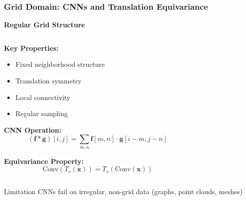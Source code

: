 \begin{frame}[fragile]\frametitle{Grid Domain: CNNs and Translation Equivariance}

\begin{center}
\textbf{Regular Grid Structure}
\end{center}

\begin{columns}
\begin{column}{0.6\textwidth}
\textbf{Key Properties:}
\begin{itemize}
\item Fixed neighborhood structure
\item Translation symmetry
\item Local connectivity
\item Regular sampling
\end{itemize}

\vspace{0.5cm}
\textbf{CNN Operation:}
$$(\mathbf{f} * \mathbf{g})[i,j] = \sum_{m,n} \mathbf{f}[m,n] \cdot \mathbf{g}[i-m, j-n]$$

\textbf{Equivariance Property:}
$$\text{Conv}(T_v(\mathbf{x})) = T_v(\text{Conv}(\mathbf{x}))$$
\end{column}
\begin{column}{0.4\textwidth}

\end{column}
\end{columns}

\begin{alertblock}{Limitation}
CNNs fail on irregular, non-grid data (graphs, point clouds, meshes)
\end{alertblock}

\end{frame}

